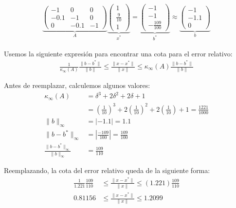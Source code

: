 \begin{homeworkProblem}
\begin{enumerate}
\begin{solucion}
\begin{align*}
    \underbrace{
        \begin{pmatrix}
            -1 & 0 & 0\\
            -0.1 & -1 & 0\\
            0 & -0.1 & -1
        \end{pmatrix}
        }_{A}
        \underbrace{
        \begin{pmatrix}
            1  \\
            \frac{9}{10}  \\
            1 
        \end{pmatrix}
        }_{x^*}=
        \underbrace{
        \begin{pmatrix}
            -1 \\
            -1 \\
            -\frac{109}{100}
        \end{pmatrix}
        }_{b^*}\approx \underbrace{
        \begin{pmatrix}
            -1 \\
            -1.1 \\
            0
        \end{pmatrix}
        }_{b}
\end{align*}

Usemos la siguiente expresión para encontrar una cota para el error relativo:
\begin{align*}
    \frac{1}{\kappa_\infty(A)}\frac{\|b-b^*\|}{\|b\|} \leq \frac{\|x-x^*\|}{\|x\|} \leq \kappa_\infty(A)\frac{\|b-b^*\|}{\|b\|}
\end{align*}

Antes de reemplazar, calculemos algunos valores:
\begin{align*}
    \kappa_\infty(A) &= \delta^3 + 2\delta^2 + 2\delta + 1\\
    &= \left(\frac{1}{10}\right)^3 + 2\left(\frac{1}{10}\right)^2 + 2\left(\frac{1}{10}\right) + 1 = \frac{1221}{1000}\\
    \|b\|_\infty &= \left|-1.1\right| = 1.1\\
    \|b-b^*\|_\infty &= \left|\frac{-109}{100}\right| = \frac{109}{100}\\
    \frac{\|b-b^{*}\|_{\infty}}{\|b\|_{\infty}}&=\frac{109}{110}
\end{align*}

Reemplazando, la cota del error relativo queda de la siguiente forma:
\begin{align*}
    \frac{1}{1.221} \frac{109}{110} &\leq \frac{\|x-x^*\|}{\|x\|} \leq (1.221) \frac{109}{110}\\
    0.81156 &\leq \frac{\|x-x^*\|}{\|x\|} \leq 1.2099
\end{align*}


\end{solucion}
\end{enumerate}
\end{homeworkProblem}
